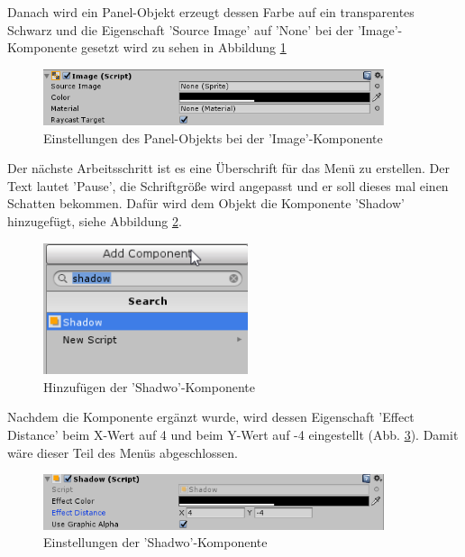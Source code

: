 Danach wird ein Panel-Objekt erzeugt dessen Farbe auf ein transparentes Schwarz und die Eigenschaft ’Source Image’ auf ’None’ bei der ’Image’-Komponente gesetzt wird zu sehen in Abbildung \ref{Panel Pause}

\begin{figure}[H]
	\includegraphics[width=10cm]{images/PanelPause.png}
	\caption{Einstellungen des Panel-Objekts bei der 'Image'-Komponente}
	\label{Panel Pause}
\end{figure}

Der nächste Arbeitsschritt ist es eine Überschrift für das Menü zu erstellen. Der Text lautet ’Pause’, die Schriftgröße wird angepasst und er soll dieses mal einen Schatten bekommen. Dafür wird dem Objekt die Komponente ’Shadow’ hinzugefügt, siehe Abbildung \ref{addshadow}.

\begin{figure}[H]
	\includegraphics[width=6cm]{images/addshadow.png}
	\caption{Hinzufügen der 'Shadwo'-Komponente}
	\label{addshadow}
\end{figure}

Nachdem die Komponente ergänzt wurde, wird dessen Eigenschaft ’Effect Distance’ beim X-Wert auf 4 und beim Y-Wert auf -4 eingestellt (Abb. \ref{shadowSetup}). Damit wäre dieser Teil des Menüs abgeschlossen.
\begin{figure}[H]
	\includegraphics[width=10cm]{images/shadowSetup.png}
	\caption{Einstellungen der 'Shadwo'-Komponente}
	\label{shadowSetup}
\end{figure}

